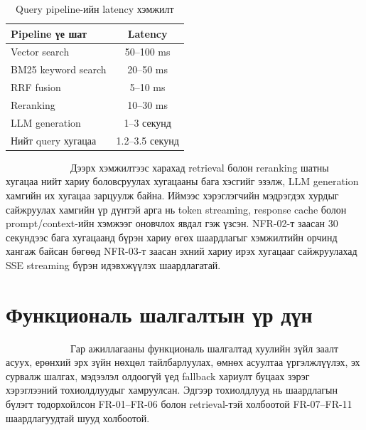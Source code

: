 \documentclass[12pt,A4]{report}
\begin{document}
\begin{table}[H]
\renewcommand{\tablename}{Хүснэгт}
\centering
\caption{Query pipeline-ийн latency хэмжилт}
\begin{tabular}{|l|c|}
\hline
\textbf{Pipeline үе шат} & \textbf{Latency} \\
\hline
Vector search & 50--100 ms \\
BM25 keyword search & 20--50 ms \\
RRF fusion & 5--10 ms \\
Reranking & 10--30 ms \\
LLM generation & 1--3 секунд \\
Нийт query хугацаа & 1.2--3.5 секунд \\
\hline
\end{tabular}
\label{tab:latency_result}
\end{table}

\ \ \ \ \ \ \ \ \  \ \ \ \ Дээрх хэмжилтээс харахад retrieval болон
reranking шатны хугацаа нийт хариу боловсруулах хугацааны бага хэсгийг
эзэлж, LLM generation хамгийн их хугацаа зарцуулж байна. Иймээс
хэрэглэгчийн мэдрэгдэх хурдыг сайжруулах хамгийн үр дүнтэй арга нь
token streaming, response cache болон prompt/context-ийн хэмжээг
оновчлох явдал гэж үзсэн. NFR-02-т заасан 30 секундээс бага хугацаанд
бүрэн хариу өгөх шаардлагыг хэмжилтийн орчинд хангаж байсан бөгөөд
NFR-03-т заасан эхний хариу ирэх хугацааг сайжруулахад SSE streaming
бүрэн идэвхжүүлэх шаардлагатай.

\section{Функциональ шалгалтын үр дүн}

\ \ \ \ \ \ \ \ \  \ \ \ \ Гар ажиллагааны функциональ шалгалтад
хуулийн зүйл заалт асуух, ерөнхий эрх зүйн нөхцөл тайлбарлуулах,
өмнөх асуултаа үргэлжлүүлэх, эх сурвалж шалгах, мэдээлэл олдоогүй
үед fallback хариулт буцаах зэрэг хэрэглээний тохиолдлуудыг хамруулсан.
Эдгээр тохиолдлууд нь шаардлагын бүлэгт тодорхойлсон FR-01--FR-06
болон retrieval-тэй холбоотой FR-07--FR-11 шаардлагуудтай шууд
холбоотой.
\end{document}
